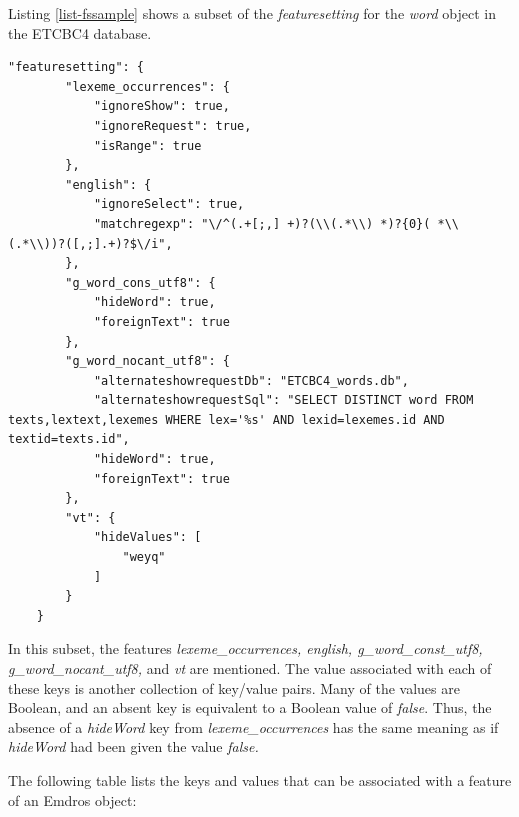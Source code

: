 \documentclass[11pt,oneside,a4paper]{memoir}
\begin{document}
Listing \ref{list-fssample} shows a subset of the \emph{featuresetting} for the \emph{word} object
in the ETCBC4 database.

\begin{lstlisting}[escapechar=\#,caption=A sample featuresetting value,label=list-fssample]
    "featuresetting": {
        "lexeme_occurrences": {
            "ignoreShow": true,
            "ignoreRequest": true,
            "isRange": true
        },
        "english": {
            "ignoreSelect": true,
            "matchregexp": "\/^(.+[;,] +)?(\\(.*\\) *)?{0}( *\\(.*\\))?([,;].+)?$\/i",
        },
        "g_word_cons_utf8": {
            "hideWord": true,
            "foreignText": true
        },
        "g_word_nocant_utf8": {
            "alternateshowrequestDb": "ETCBC4_words.db",
            "alternateshowrequestSql": "SELECT DISTINCT word FROM texts,lextext,lexemes WHERE lex='%s' AND lexid=lexemes.id AND textid=texts.id",
            "hideWord": true,
            "foreignText": true
        },
        "vt": {
            "hideValues": [
                "weyq"
            ]
        }
    }
\end{lstlisting}

In this subset, the features \emph{lexeme\_occurrences, english, g\_word\_const\_utf8,
  g\_word\_nocant\_utf8,} and \emph{vt} are mentioned. The value associated with each of these keys is
another collection of key/value pairs. Many of the values are Boolean, and an absent key is
equivalent to a Boolean value of \emph{false}. Thus, the absence of a \emph{hideWord} key from
\emph{lexeme\_occurrences} has the same meaning as if \emph{hideWord} had been given the value
\emph{false.}

The following table lists the keys and values that can be associated with a feature of an Emdros
object:
\end{document}
